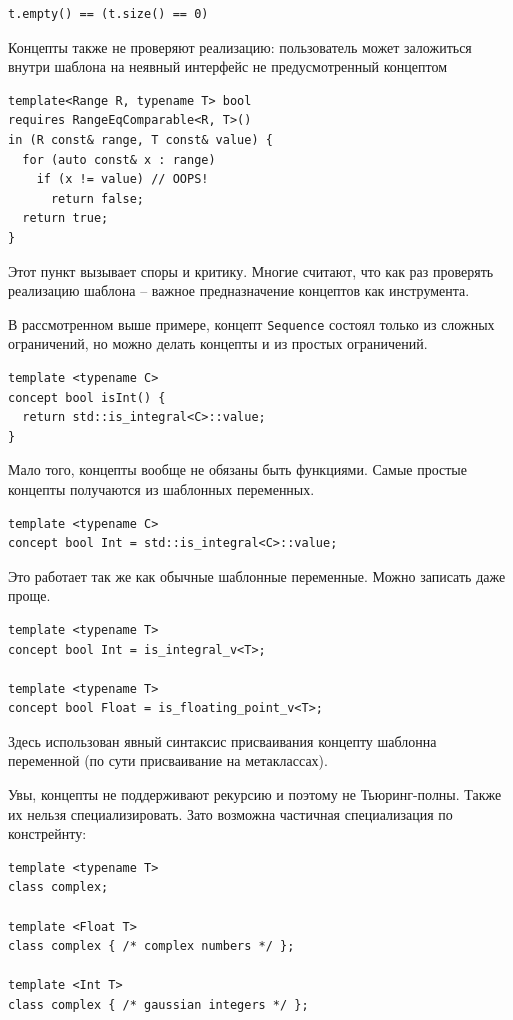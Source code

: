 \documentclass[a4paper,12pt,oneside]{book}
\begin{document}
\begin{lstlisting}
t.empty() == (t.size() == 0)
\end{lstlisting}

Концепты также не проверяют реализацию: пользователь может заложиться внутри шаблона на неявный интерфейс не предусмотренный концептом

\begin{lstlisting}
template<Range R, typename T> bool
requires RangeEqComparable<R, T>()
in (R const& range, T const& value) {
  for (auto const& x : range)
    if (x != value) // OOPS!
      return false;
  return true;
}
\end{lstlisting}

Этот пункт вызывает споры и критику. Многие считают, что как раз проверять реализацию шаблона -- важное предназначение концептов как инструмента.

В рассмотренном выше примере, концепт \lstinline!Sequence! состоял только из сложных ограничений, но можно делать концепты и из простых ограничений.

\begin{lstlisting}
template <typename C> 
concept bool isInt() { 
  return std::is_integral<C>::value;
}
\end{lstlisting}

Мало того, концепты вообще не обязаны быть функциями. Самые простые концепты получаются из шаблонных переменных.

\begin{lstlisting}
template <typename C> 
concept bool Int = std::is_integral<C>::value;
\end{lstlisting}

Это работает так же как обычные шаблонные переменные. Можно записать даже проще.

\begin{lstlisting}
template <typename T>
concept bool Int = is_integral_v<T>;

template <typename T>
concept bool Float = is_floating_point_v<T>;
\end{lstlisting}

Здесь использован явный синтаксис присваивания концепту шаблонна переменной (по сути присваивание на метаклассах).

Увы, концепты не поддерживают рекурсию и поэтому не Тьюринг-полны. Также их нельзя специализировать. Зато возможна частичная специализация по констрейнту:

\begin{lstlisting}
template <typename T>
class complex;

template <Float T>
class complex { /* complex numbers */ };

template <Int T>
class complex { /* gaussian integers */ };
\end{lstlisting}
\end{document}
